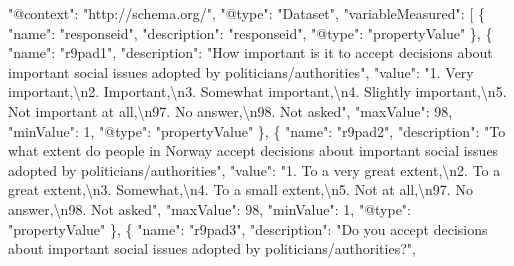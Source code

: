 \documentclass[
]{book}
\newenvironment{Shaded}{\begin{snugshade}}{\end{snugshade}}
\newcommand{\CharTok}[1]{\textcolor[rgb]{0.31,0.60,0.02}{#1}}
\newcommand{\DataTypeTok}[1]{\textcolor[rgb]{0.13,0.29,0.53}{#1}}
\newcommand{\DecValTok}[1]{\textcolor[rgb]{0.00,0.00,0.81}{#1}}
\newcommand{\FunctionTok}[1]{\textcolor[rgb]{0.00,0.00,0.00}{#1}}
\newcommand{\OtherTok}[1]{\textcolor[rgb]{0.56,0.35,0.01}{#1}}
\newcommand{\StringTok}[1]{\textcolor[rgb]{0.31,0.60,0.02}{#1}}
\begin{document}
\begin{Shaded}
\begin{Highlighting}[]
  \DataTypeTok{"@context"}\FunctionTok{:} \StringTok{"http://schema.org/"}\FunctionTok{,}
  \DataTypeTok{"@type"}\FunctionTok{:} \StringTok{"Dataset"}\FunctionTok{,}
  \DataTypeTok{"variableMeasured"}\FunctionTok{:} \OtherTok{[}
    \FunctionTok{\{}
      \DataTypeTok{"name"}\FunctionTok{:} \StringTok{"responseid"}\FunctionTok{,}
      \DataTypeTok{"description"}\FunctionTok{:} \StringTok{"responseid"}\FunctionTok{,}
      \DataTypeTok{"@type"}\FunctionTok{:} \StringTok{"propertyValue"}
    \FunctionTok{\}}\OtherTok{,}
    \FunctionTok{\{}
      \DataTypeTok{"name"}\FunctionTok{:} \StringTok{"r9pad1"}\FunctionTok{,}
      \DataTypeTok{"description"}\FunctionTok{:} \StringTok{"How important is it to accept decisions about important social issues adopted by politicians/authorities"}\FunctionTok{,}
      \DataTypeTok{"value"}\FunctionTok{:} \StringTok{"1. Very important,}\CharTok{\textbackslash{}n}\StringTok{2. Important,}\CharTok{\textbackslash{}n}\StringTok{3. Somewhat important,}\CharTok{\textbackslash{}n}\StringTok{4. Slightly important,}\CharTok{\textbackslash{}n}\StringTok{5. Not important at all,}\CharTok{\textbackslash{}n}\StringTok{97. No answer,}\CharTok{\textbackslash{}n}\StringTok{98. Not asked"}\FunctionTok{,}
      \DataTypeTok{"maxValue"}\FunctionTok{:} \DecValTok{98}\FunctionTok{,}
      \DataTypeTok{"minValue"}\FunctionTok{:} \DecValTok{1}\FunctionTok{,}
      \DataTypeTok{"@type"}\FunctionTok{:} \StringTok{"propertyValue"}
    \FunctionTok{\}}\OtherTok{,}
    \FunctionTok{\{}
      \DataTypeTok{"name"}\FunctionTok{:} \StringTok{"r9pad2"}\FunctionTok{,}
      \DataTypeTok{"description"}\FunctionTok{:} \StringTok{"To what extent do people in Norway accept decisions about important social issues adopted by politicians/authorities"}\FunctionTok{,}
      \DataTypeTok{"value"}\FunctionTok{:} \StringTok{"1. To a very great extent,}\CharTok{\textbackslash{}n}\StringTok{2. To a great extent,}\CharTok{\textbackslash{}n}\StringTok{3. Somewhat,}\CharTok{\textbackslash{}n}\StringTok{4. To a small extent,}\CharTok{\textbackslash{}n}\StringTok{5. Not at all,}\CharTok{\textbackslash{}n}\StringTok{97. No answer,}\CharTok{\textbackslash{}n}\StringTok{98. Not asked"}\FunctionTok{,}
      \DataTypeTok{"maxValue"}\FunctionTok{:} \DecValTok{98}\FunctionTok{,}
      \DataTypeTok{"minValue"}\FunctionTok{:} \DecValTok{1}\FunctionTok{,}
      \DataTypeTok{"@type"}\FunctionTok{:} \StringTok{"propertyValue"}
    \FunctionTok{\}}\OtherTok{,}
    \FunctionTok{\{}
      \DataTypeTok{"name"}\FunctionTok{:} \StringTok{"r9pad3"}\FunctionTok{,}
      \DataTypeTok{"description"}\FunctionTok{:} \StringTok{"Do you accept decisions about important social issues adopted by politicians/authorities?"}\FunctionTok{,}

\end{Highlighting}
\end{Shaded}
\end{document}
